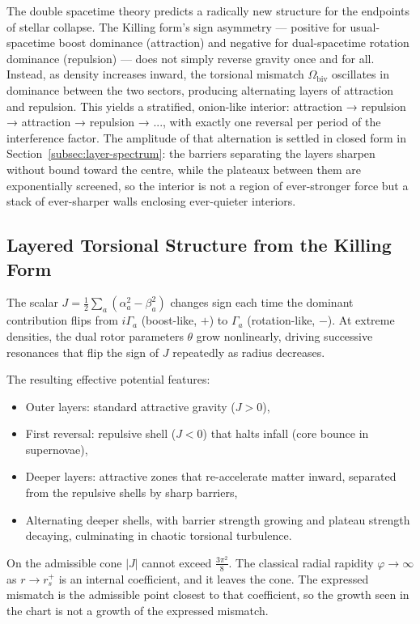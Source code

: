 \documentclass[a4paper]{article}
\newcommand{\Jbound}{\frac{3\pi^2}{8}}
\begin{document}
The double spacetime theory predicts a radically new structure for the endpoints of stellar collapse. The Killing form's sign asymmetry — positive for usual-spacetime boost dominance (attraction) and negative for dual-spacetime rotation dominance (repulsion) — does not simply reverse gravity once and for all. Instead, as density increases inward, the torsional mismatch $\Omega_\text{biv}$ oscillates in dominance between the two sectors, producing alternating layers of attraction and repulsion. This yields a stratified, onion-like interior: attraction → repulsion → attraction → repulsion → ..., with exactly one reversal per period of the interference factor. The amplitude of that alternation is settled in closed form in Section~\ref{subsec:layer-spectrum}: the barriers separating the layers sharpen without bound toward the centre, while the plateaux between them are exponentially screened, so the interior is not a region of ever-stronger force but a stack of ever-sharper walls enclosing ever-quieter interiors.

\subsection{Layered Torsional Structure from the Killing Form}

The scalar $J = \frac12\sum_a(\alpha_a^2-\beta_a^2)$ changes sign each time the dominant contribution flips from $i\Gamma_a$ (boost-like, $+$) to $\Gamma_a$ (rotation-like, $-$). At extreme densities, the dual rotor parameters $\theta$ grow nonlinearly, driving successive resonances that flip the sign of $J$ repeatedly as radius decreases.

The resulting effective potential features:
\begin{itemize}
\item Outer layers: standard attractive gravity ($J > 0$),
\item First reversal: repulsive shell ($J < 0$) that halts infall (core bounce in supernovae),
\item Deeper layers: attractive zones that re-accelerate matter inward, separated from the repulsive shells by sharp barriers,
\item Alternating deeper shells, with barrier strength growing and plateau strength decaying, culminating in chaotic torsional turbulence.
\end{itemize}
On the admissible cone $|J|$ cannot exceed $\Jbound$. The classical radial rapidity $\varphi\to\infty$ as $r\to r_s^+$ is an internal coefficient, and it leaves the cone. The expressed mismatch is the admissible point closest to that coefficient, so the growth seen in the chart is not a growth of the expressed mismatch.
\end{document}

